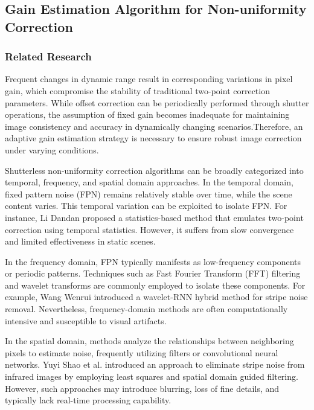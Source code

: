 \documentclass[a4paper,fleqn]{cas-dc}
\begin{document}
\subsection{Gain Estimation Algorithm for Non-uniformity Correction}
\label{subsec2}
\subsubsection{Related Research}

Frequent changes in dynamic range result in corresponding variations in pixel gain, which compromise the stability of traditional two-point correction parameters. While offset correction can be periodically performed through shutter operations, the assumption of fixed gain becomes inadequate for maintaining image consistency and accuracy in dynamically changing scenarios.Therefore, an adaptive gain estimation strategy is necessary to ensure robust image correction under varying conditions.

Shutterless non-uniformity correction algorithms can be broadly categorized into temporal, frequency, and spatial domain approaches.
In the temporal domain, fixed pattern noise (FPN) remains relatively stable over time, while the scene content varies. This temporal variation can be exploited to isolate FPN\citep{liu_fpn_2019,zeng_adaptive_2015}. For instance, Li Dandan proposed a statistics-based method that emulates two-point correction using temporal statistics\citep{dandan_nonuniformity_2024}. However, it suffers from slow convergence and limited effectiveness in static scenes.

In the frequency domain, FPN typically manifests as low-frequency components or periodic patterns. Techniques such as Fast Fourier Transform (FFT) filtering and wavelet transforms are commonly employed to isolate these components. For example, Wang Wenrui introduced a wavelet-RNN hybrid method for stripe noise removal\citep{wang_novel_2024}. Nevertheless, frequency-domain methods are often computationally intensive and susceptible to visual artifacts.

In the spatial domain, methods analyze the relationships between neighboring pixels to estimate noise, frequently utilizing filters or convolutional neural networks\citep{kuang_single_2019,liu_strong_2023}. Yuyi Shao et al. introduced an approach to eliminate stripe noise from infrared images by employing least squares and spatial domain guided filtering\citep{shao_infrared_2021}. However, such approaches may introduce blurring, loss of fine details, and typically lack real-time processing capability.
\end{document}
